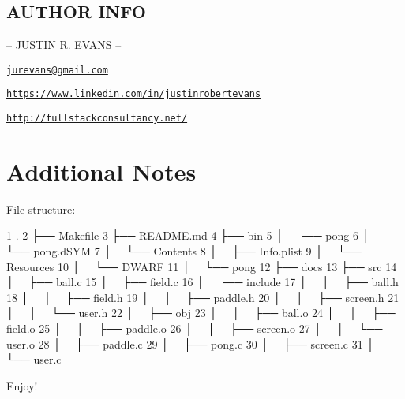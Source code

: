 \subsection*{A\+U\+T\+H\+O\+R I\+N\+F\+O }

-- J\+U\+S\+T\+I\+N R. E\+V\+A\+N\+S --

\href{mailto:jurevans@gmail.com}{\tt jurevans@gmail.\+com}

\href{https://www.linkedin.com/in/justinrobertevans}{\tt https\+://www.\+linkedin.\+com/in/justinrobertevans}

\href{http://fullstackconsultancy.net/}{\tt http\+://fullstackconsultancy.\+net/}

\section*{Additional Notes }

File structure\+:


\begin{DoxyCode}
1 .
2 ├── Makefile
3 ├── README.md
4 ├── bin
5 │   ├── pong
6 │   └── pong.dSYM
7 │       └── Contents
8 │           ├── Info.plist
9 │           └── Resources
10 │               └── DWARF
11 │                   └── pong
12 ├── docs
13 ├── src
14 │   ├── ball.c
15 │   ├── field.c
16 │   ├── include
17 │   │   ├── ball.h
18 │   │   ├── field.h
19 │   │   ├── paddle.h
20 │   │   ├── screen.h
21 │   │   └── user.h
22 │   ├── obj
23 │   │   ├── ball.o
24 │   │   ├── field.o
25 │   │   ├── paddle.o
26 │   │   ├── screen.o
27 │   │   └── user.o
28 │   ├── paddle.c
29 │   ├── pong.c
30 │   ├── screen.c
31 │   └── user.c
\end{DoxyCode}


Enjoy! 